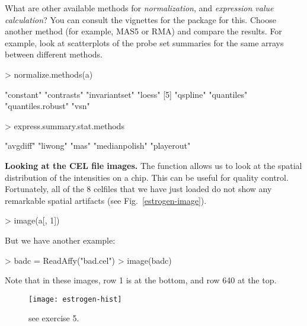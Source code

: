 \documentclass[a4paper]{article}
\begin{document}
\begin{exercises}
\begin{exercise}
\item What are other available methods for \textit{normalization}, and
\textit{expression value calculation}? You can consult the vignettes for the
 package for this. Choose another method (for example,
MAS5 or RMA) and compare the results. For example, look at scatterplots of the
probe set summaries for the same arrays between different methods.

\begin{Schunk}
\begin{Sinput}
> normalize.methods(a)
\end{Sinput}
\begin{Soutput}
[1] "constant"         "contrasts"        "invariantset"     "loess"           
[5] "qspline"          "quantiles"        "quantiles.robust" "vsn"             
\end{Soutput}
\begin{Sinput}
> express.summary.stat.methods
\end{Sinput}
\begin{Soutput}
[1] "avgdiff"      "liwong"       "mas"          "medianpolish" "playerout"   
\end{Soutput}
\end{Schunk}
\end{exercise}


\item {\bf Looking at the CEL file images.}  
The  function allows us to look at the spatial 
distribution of the intensities on a chip. This can be useful for 
quality control. Fortunately, all of the 8 celfiles that we have 
just loaded do not show any remarkable spatial artifacts 
(see Fig.~\ref{estrogen-image}).
%
\begin{Schunk}
\begin{Sinput}
> image(a[, 1])
\end{Sinput}
\end{Schunk}
%
But we have another example:
%
\begin{Schunk}
\begin{Sinput}
> badc = ReadAffy("bad.cel")
> image(badc)
\end{Sinput}
\end{Schunk}
%
Note that in these images, row 1 is at the bottom, and row 640 
at the top.

\begin{figure}[h]
\begin{center}	
  \texttt{[image: estrogen-hist]}
  \caption{\label{estrogen-hist} see exercise 5.}
 \end{center}
\end{figure}


\end{exercises}
\end{document}
